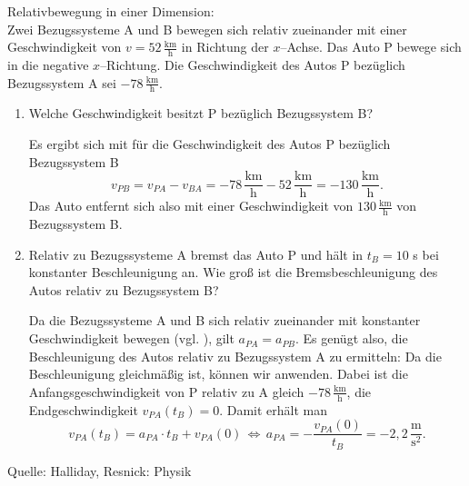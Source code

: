       \begin{MExercises}

      \begin{MExercise} Relativbewegung in einer Dimension:\\
      Zwei Bezugssysteme A und B bewegen sich relativ zueinander mit einer Geschwindigkeit von $v=52  \,\frac{\text{km}}{\text{h}}$ in Richtung der $x$--Achse. Das Auto P bewege sich in die negative $x$--Richtung. Die Geschwindigkeit des Autos P bez\"uglich Bezugssystem A sei $-78  \,\frac{\text{km}}{\text{h}}$. 
      \begin{enumerate}
      \item Welche Geschwindigkeit besitzt P bez\"uglich Bezugssystem B? 
      
      \begin{MSolution} Es ergibt sich mit  f\"ur die Geschwindigkeit des Autos P bez\"uglich Bezugssystem B 
      $${v}_{PB}={v}_{PA}-{v}_{BA}=-78  \,\frac{\text{km}}{\text{h}}-52  \,\frac{\text{km}}{\text{h}}=-130 \,\frac{\text{km}}{\text{h}}.
      $$
      Das Auto entfernt sich also mit einer Geschwindigkeit von $ 130\, \frac{\text{km}}{\text{h}}$ von Bezugssystem B.
      \end{MSolution}
      \item Relativ zu Bezugssysteme A bremst das Auto P und h\"alt in $t_B=10$ s bei konstanter Beschleunigung an. Wie gro{\ss} ist die Bremsbeschleunigung des Autos relativ zu Bezugssystem B?
      
      \begin{MSolution} Da die Bezugssysteme A und B sich relativ zueinander mit konstanter Geschwindigkeit bewegen (vgl. ), gilt $a_{PA}=a_{PB}$. Es gen\"ugt also, die Beschleunigung des Autos relativ zu Bezugssystem A zu ermitteln: Da die Beschleunigung gleichm\"a{\ss}ig ist, k\"onnen wir  anwenden. Dabei ist die Anfangsgeschwindigkeit von P relativ zu A gleich $-78 \, \frac{\text{km}}{\text{h}}$, die Endgeschwindigkeit ${v}_{PA}(t_B)=0$. Damit erh\"alt man
      $$
      {v}_{PA}(t_B)=a_{PA}\cdot t_B+{v}_{PA}(0)\,\Leftrightarrow\, a_{PA}= -\frac{{v}_{PA}(0)}{t_B}=- {2,2}\,\frac{\text{m}}{\text{s}^2}.
      $$
      
      \end{MSolution}
      \end{enumerate}
      
      Quelle: Halliday, Resnick: Physik
      \end{MExercise}
      \clearpage
      

\end{MExercises}
